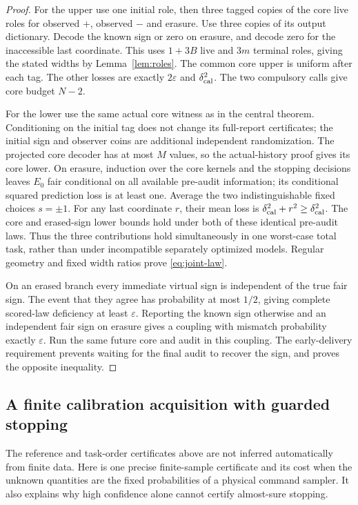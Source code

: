 \begin{proof}
For the upper use one initial role, then three tagged copies of the core live roles for observed $+$, observed $-$ and erasure. Use three copies of its output dictionary. Decode the known sign or zero on erasure, and decode zero for the inaccessible last coordinate. This uses $1+3B$ live and $3m$ terminal roles, giving the stated widths by Lemma~\ref{lem:roles}. The common core upper is uniform after each tag. The other losses are exactly $2\varepsilon$ and $\delta_{\rm cal}^2$. The two compulsory calls give core budget $N-2$.

For the lower use the same actual core witness as in the central theorem. Conditioning on the initial tag does not change its full-report certificates; the initial sign and observer coins are additional independent randomization. The projected core decoder has at most $M$ values, so the actual-history proof gives its core lower. On erasure, induction over the core kernels and the stopping decisions leaves $E_0$ fair conditional on all available pre-audit information; its conditional squared prediction loss is at least one. Average the two indistinguishable fixed choices $s=\pm1$. For any last coordinate $r$, their mean loss is $\delta_{\rm cal}^2+r^2\ge\delta_{\rm cal}^2$. The core and erased-sign lower bounds hold under both of these identical pre-audit laws. Thus the three contributions hold simultaneously in one worst-case total task, rather than under incompatible separately optimized models. Regular geometry and fixed width ratios prove \eqref{eq:joint-law}.

On an erased branch every immediate virtual sign is independent of the true fair sign. The event that they agree has probability at most $1/2$, giving complete scored-law deficiency at least $\varepsilon$. Reporting the known sign otherwise and an independent fair sign on erasure gives a coupling with mismatch probability exactly $\varepsilon$. Run the same future core and audit in this coupling. The early-delivery requirement prevents waiting for the final audit to recover the sign, and proves the opposite inequality.
\end{proof}

\subsection*{A finite calibration acquisition with guarded stopping}
The reference and task-order certificates above are not inferred automatically from finite data. Here is one precise finite-sample certificate and its cost when the unknown quantities are the fixed probabilities of a physical command sampler. It also explains why high confidence alone cannot certify almost-sure stopping.


